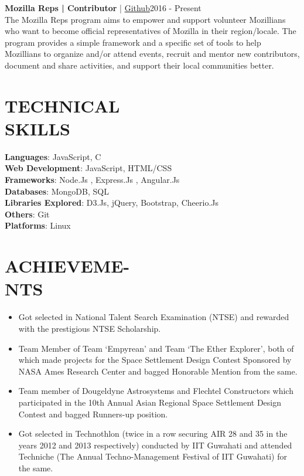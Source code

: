 \documentclass[margin]{res}
\begin{document}
\begin{resume}
      \textbf{Mozilla Reps |  Contributor}  | \href{https://github.com/mozilla/remo/pulls/karanagarwal17}{ Github}\hfill 2016 - Present \\
      The Mozilla Reps program aims to empower and support volunteer Mozillians who want to become official representatives of Mozilla in their region/locale.
      The program provides a simple framework and a specific set of tools to help Mozillians to organize and/or attend events, recruit and mentor new contributors, document and share activities, and support their local communities better.

\section{TECHNICAL \\ SKILLS}
  {\textbf{Languages}:} JavaScript, C\\
	{\textbf{Web Development}:} JavaScript, HTML/CSS\\
  {\textbf{Frameworks}:} Node.Js , Express.Js , Angular.Js\\
  {\textbf{Databases}:} MongoDB, SQL\\
  {\textbf{Libraries Explored}:} D3.Js, jQuery, Bootstrap, Cheerio.Js\\
  {\textbf{Others}:} Git\\
  {\textbf{Platforms}:} Linux

  \section{ACHIEVEME-\\NTS}
  \begin{itemize}  \itemsep -2pt %
      \item Got selected in National Talent Search Examination (NTSE) and rewarded with the prestigious NTSE Scholarship.
      \item Team Member of Team ‘Empyrean’ and Team ‘The Ether Explorer’, both of which made projects for the Space Settlement Design Contest Sponsored by NASA Ames Research Center and bagged Honorable Mention from the same.
      \item Team member of Dougeldyne Astrosystems and Flechtel Constructors which participated in the 10th Annual Asian Regional Space Settlement Design\\ Contest and bagged Runners-up position.
      \item Got selected in Technothlon (twice in a row securing AIR 28 and 35 in the years 2012 and 2013 respectively) conducted by IIT Guwahati and attended Techniche (The Annual Techno-Management Festival of IIT Guwahati) for the same.
  \end{itemize}


\end{resume}
\end{document}
